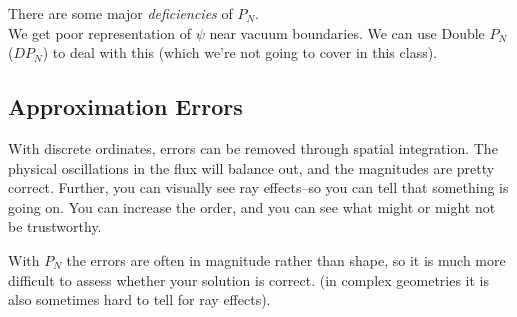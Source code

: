 \documentclass[12pt]{article}
\begin{document}
There are some major \textit{deficiencies} of $P_N$. \\
We get poor representation of $\psi$ near vacuum boundaries. We can use Double $P_N$ ($DP_N$) to deal with this (which we're not going to cover in this class).\\


\subsection*{Approximation Errors}
With discrete ordinates, errors can be removed through spatial integration. The physical oscillations in the flux will balance out, and the magnitudes are pretty correct. Further, you can visually see ray effects--so you can tell that something is going on. You can increase the order, and you can see what might or might not be trustworthy. 

With $P_N$ the errors are often in magnitude rather than shape, so it is much more difficult to assess whether your solution is correct. (in complex geometries it is also sometimes hard to tell for ray effects). 
\end{document}
